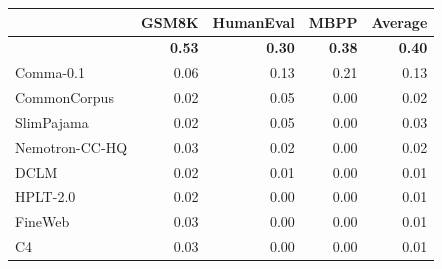 \begin{tabular}{lrrrr}
\toprule
 & GSM8K  & HumanEval & MBPP & Average \\
\midrule
\MixtureVitae{} & \textbf{0.53} & \textbf{0.30} & \textbf{0.38} & \textbf{0.40} \\
Comma-0.1 & 0.06 & 0.13 & 0.21 & 0.13 \\
CommonCorpus & 0.02 & 0.05 & 0.00 & 0.02 \\
\midrule
SlimPajama & 0.02 & 0.05 & 0.00 & 0.03 \\
Nemotron-CC-HQ & 0.03 & 0.02 & 0.00 & 0.02 \\
DCLM & 0.02 & 0.01 & 0.00 & 0.01 \\
HPLT-2.0 & 0.02 & 0.00 & 0.00 & 0.01 \\
FineWeb & 0.03 & 0.00 & 0.00 & 0.01 \\
C4 & 0.03 & 0.00 & 0.00 & 0.01 \\
\bottomrule
\end{tabular}